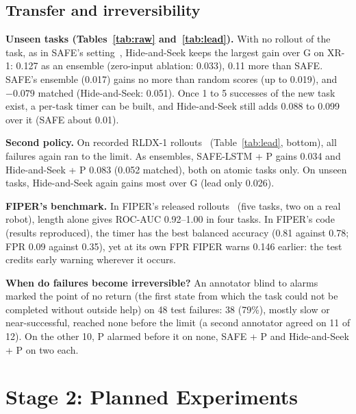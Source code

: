 \documentclass[conference]{IEEEtran}
\begin{document}
\subsection{Transfer and irreversibility}
\textbf{Unseen tasks (Tables~\ref{tab:raw} and~\ref{tab:lead}).} With no rollout of the task, as in SAFE's setting~\cite{gu2025safe},
Hide-and-Seek keeps the largest gain over G on XR-1: 0.127 as an ensemble (zero-input
ablation: 0.033), 0.11 more than SAFE. SAFE's ensemble (0.017) gains no more than random
scores (up to 0.019), and $-0.079$ matched (Hide-and-Seek: 0.051). Once 1 to 5 successes of the new task exist, a
per-task timer can be built, and Hide-and-Seek still adds 0.088 to 0.099 over it (SAFE about
0.01).

\textbf{Second policy.} On recorded RLDX-1 rollouts~\cite{kim2026rldx}
(Table~\ref{tab:lead}, bottom), all failures again ran to the limit. As ensembles, SAFE-LSTM + P
gains 0.034 and Hide-and-Seek + P 0.083 (0.052 matched), both on atomic tasks only. On unseen tasks,
Hide-and-Seek again gains most over G (lead only 0.026).

\textbf{FIPER's benchmark.} In FIPER's released rollouts~\cite{romer2025fiper} (five tasks, two
on a real robot), length alone gives ROC-AUC 0.92--1.00 in four tasks. In FIPER's code (results
reproduced), the timer has the best balanced accuracy (0.81 against 0.78; FPR 0.09 against
0.35), yet at its own FPR FIPER warns 0.146 earlier: the test credits early warning wherever it
occurs.

\textbf{When do failures become irreversible?} An annotator blind to alarms marked the point of
no return (the first state from which the task could not be completed without outside help) on
48 test failures: 38 (79\%), mostly slow or near-successful, reached none before the limit (a
second annotator agreed on 11 of 12). On the other 10, P alarmed before it on none, SAFE + P and
Hide-and-Seek + P on two each.

\section{Stage 2: Planned Experiments}
\label{sec:plan}
\end{document}
